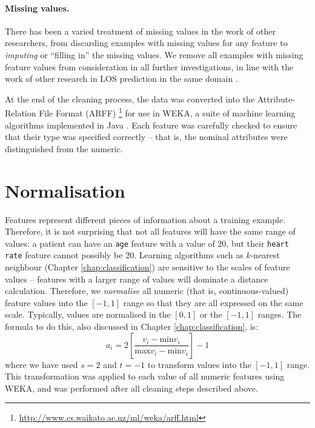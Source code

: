 \paragraph{Missing values.}
There has been a varied treatment of missing values in the work of other
researchers, from discarding examples with missing values for any feature
to \textit{imputing} or ``filling in'' the missing values. We remove all
examples with missing feature values from consideration in all further
investigations, in line with the work of other research in LOS prediction
in the same domain \cite{Dinh2013a}.

At the end of the cleaning process, the data was converted into the
Attribute-Relation File Format (ARFF)
\footnote{\url{http://www.cs.waikato.ac.nz/ml/weka/arff.html}} for use in
WEKA, a suite of machine learning algorithms implemented in Java
\cite{Hall2009}. Each feature was carefully checked to ensure that their
type was specified correctly -- that is, the nominal attributes were
distinguished from the numeric.

\section{Normalisation}
Features represent different pieces of information about a training example.
Therefore, it is not surprising that not all features will have the same range
of values: a patient can have an \texttt{age} feature with a value of 20, but
their \texttt{heart rate} feature cannot possibly be 20. Learning algorithms
such as $k$-nearest neighbour (Chapter \ref{chap:classification})
are sensitive to the scales of feature values -- features with a larger range
of values will dominate a distance calculation. Therefore, we
\textit{normalise} all numeric (that is, continuous-valued)
feature values into the $[-1,1]$ range so that they are all expressed on the
same scale. Typically, values are normalised in the $[0,1]$ or the $[-1,1]$
ranges.
The formula to do this, also discussed in Chapter \ref{chap:classification},
is:
\begin{equation*}
a_i = 2\left[\dfrac{v_i - \mathrm{min }v_i}{\mathrm{max }v_i - \mathrm{min }v_i}\right] - 1
\end{equation*}
where we have used $s=2$ and $t=-1$ to transform values into the $[-1,1]$
range. This transformation was applied to each value of all numeric features
using WEKA, and was performed after all cleaning steps described above.

